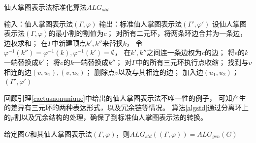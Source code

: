 \begin{algorithm}
  \caption{仙人掌图表示法标准化算法$ALG_{std}$}
  \label{algstd}
  \begin{algorithmic}[1] %
  \Statex 输入：仙人掌图表示法$(\Gamma,\varphi)$
  \Statex 输出：标准仙人掌图表示法$(\Gamma',\varphi')$
  \State 设仙人掌图表示法$(\Gamma,\varphi)$的最小割的割值为$c$；
  \State 对所有二元环，将两条环边合并为一条边，边权求和；
          \State 在$\Gamma$中新建顶点$k',k''$来替换$k$，
          \State 令$\varphi^{-1}(k'')=\varphi^{-1}(k),\varphi^{-1}(k')=\emptyset$，
          \State 在$k',k''$之间连一条边权为$c$的边；
                \State 将$e$的$k$一端替换成$k'$；
                \State 将$e$的$k$一端替换成$k''$；
            \EndIf
          \EndFor
      \EndFor
  \EndFor
  \State 对$\Gamma$中的所有三元环执行点收缩；
          \State 找到与$v$相连的边$(v,u_1),(v,u_2)$；
          \State 删除点$v$以及与其相连的边；
          \State 加入边$(u_1,u_2)$；
      \EndIf
  \EndFor
  \State \Return $(\Gamma',\varphi')$
  \end{algorithmic}
\end{algorithm}

回顾引理\ref{cactusnonunique}中给出的仙人掌图表示法不唯一性的例子，
可知产生的差异有三元环的两种表达形式，以及冗余链等情况。
算法\ref{algstd}通过分离环上的$p$割以及冗余结构的处理，确保了到标准仙人掌图表示法的转换。

\begin{theorem}
  给定图$G$和其仙人掌图表示法$(\Gamma,\varphi)$，则$ALG_{std}((\Gamma,\varphi))=ALG_{gen}(G)$
\end{theorem}

